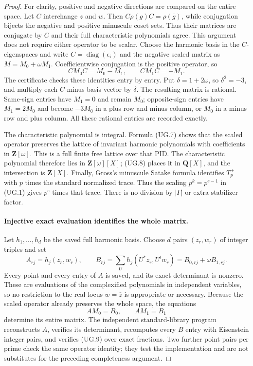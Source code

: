 \begin{proof}
For clarity, positive and negative directions are compared on
the entire space. Let $C$ interchange $z$ and $w$. Then
$C\rho(g)C=\rho(\overline g)$, while conjugation bijects the
negative and positive minuscule coset sets. Thus their matrices
are conjugate by $C$ and their full characteristic polynomials
agree. This argument does not require either operator to be scalar.
Choose the harmonic basis in the $C$-eigenspaces and write
$C=\operatorname{diag}(\epsilon_i)$ and the negative scaled
matrix as $M=M_0+\omega M_1$. Coefficientwise conjugation is the
positive operator, so
\[
 CM_0C=M_0-M_1,\qquad CM_1C=-M_1.
 \tag{UG.8}
\]
The certificate checks these identities entry by entry.
Put $\delta=1+2\omega$, so $\delta^2=-3$, and multiply each
$C$-minus basis vector by $\delta$. The resulting matrix is
rational. Same-sign entries have $M_1=0$ and remain $M_0$;
opposite-sign entries have $M_1=2M_0$ and become $-3M_0$ in
a plus row and minus column, or $M_0$ in a minus row and plus
column. All these rational entries are recorded exactly.

The characteristic polynomial is integral. Formula (UG.7) shows
that the scaled operator preserves the lattice of invariant
harmonic polynomials with coefficients in $\mathbf Z[\omega]$.
This is a full finite free lattice over that PID. The
characteristic polynomial therefore lies in $\mathbf Z[\omega][X]$;
(UG.8) places it in $\mathbf Q[X]$, and the intersection is
$\mathbf Z[X]$.
Finally, Gross's minuscule Satake formula
\cite[\S3, (3.13)--(3.14), p.~8]{K17GrossSatake1998}
identifies $T_p^+$ with $p$ times the standard normalized trace.
Thus the scaling $p^k=p^{e-1}$ in (UG.1) gives $p^e$ times that
trace. There is no division by $|\Gamma|$ or extra stabilizer factor.

\paragraph{Injective exact evaluation identifies the whole matrix.}
Let $h_1,\ldots,h_d$ be the saved full harmonic basis. Choose $d$
pairs $(z_r,w_r)$ of integer triples and set
\[
 A_{rj}=h_j(z_r,w_r),\qquad
 B_{rj}=\sum_U h_j(U^*z_r,U^tw_r)=B_{0,rj}+\omega B_{1,rj}.
\]
Every point and every entry of $A$ is saved, and its exact
determinant is nonzero. These are evaluations of the complexified
polynomials in independent variables, so no restriction to the
real locus $w=\overline z$ is appropriate or necessary.
Because the scaled operator already preserves the whole space,
the equations
\[
 AM_0=B_0,\qquad AM_1=B_1
 \tag{UG.9}
\]
determine its entire matrix. The independent standard-library
program reconstructs $A$, verifies its determinant, recomputes
every $B$ entry with Eisenstein integer pairs, and verifies
(UG.9) over exact fractions. Two further point pairs per prime
check the same operator identity; they test the implementation
and are not substitutes for the preceding completeness argument.


\end{proof}
